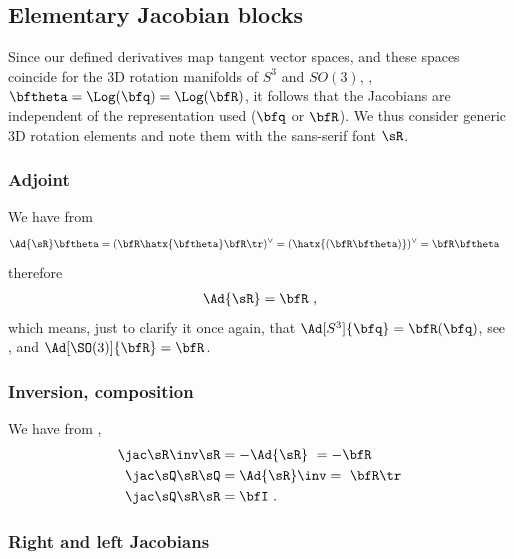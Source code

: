 \subsection{Elementary Jacobian blocks}

Since our defined derivatives map tangent vector spaces, and these spaces coincide for the 3D rotation manifolds of $S^3$ and $SO(3)$, \ie, $\bth=\Log(\bfq)=\Log(\bfR)$, it follows that the Jacobians are independent of the representation used ($\bfq$ or $\bfR$). 
We thus consider generic 3D rotation elements and note them with the sans-serif font $\sR$. 
%


\subsubsection{Adjoint}

We have from 
%
\begin{align*}
\Ad{\sR} \bth
&= (\bfR\hatx{\bth}\bfR\tr)^\vee 
= (\hatx{(\bfR\bth)})^\vee 
= \bfR\bth
\end{align*}
%
therefore
%
\begin{align}
\Ad{\sR} = \bfR~,
\end{align}
%
which means, just to clarify it once again, that $\Ad[S^3]{\bfq}=\bfR(\bfq)$, see , and $\Ad[\SO(3)]{\bfR}=\bfR$.

\subsubsection{Inversion, composition}
\label{sec:SO3_inv_comp}

We have from ,
%
\begin{align}
\mjac{\sR\inv}{\sR} &= -\Ad{\sR} ~= -\bfR \\
\mjac{\sQ\sR}{\sQ} &= \Ad{\sR}\inv = ~\bfR\tr \\
\mjac{\sQ\sR}{\sR} &= \bfI ~.
\end{align}


\subsubsection{Right and left Jacobians}

